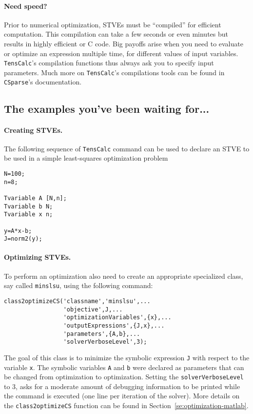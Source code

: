 \documentclass[11pt]{article}
\newcommand{\TC}{\texttt{TensCalc}}
\newcommand{\CS}{\texttt{CSparse}}
\theoremstyle{remark}
\begin{document}
\paragraph{Need speed?}
Prior to numerical optimization, STVEs must be ``compiled'' for
efficient computation. This compilation can take a few seconds or even
minutes but results in highly efficient \matlab{} or C code. Big
payoffs arise when you need to evaluate or optimize an expression
multiple time, for different values of input variables. \TC{}'s
compilation functions thus always ask you to specify input
parameters. Much more on \TC{}'s compilations tools can be found in
\CS{}'s documentation.

\subsection{The examples you've been waiting for...}

\paragraph{Creating STVEs.} The following sequence of \TC{} command can
be used to declare an STVE to be used in a simple least-squares
optimization problem
\begin{lstlisting}
N=100;
n=8;

Tvariable A [N,n];
Tvariable b N;
Tvariable x n;

y=A*x-b;
J=norm2(y);
\end{lstlisting}

\paragraph{Optimizing STVEs.}
To perform an optimization also need to create an appropriate
specialized \matlab{} class, say called \lstinline{minslsu}, using the
following command:
\begin{lstlisting}
class2optimizeCS('classname','minslsu',...
                 'objective',J,...
                 'optimizationVariables',{x},...
                 'outputExpressions',{J,x},...
                 'parameters',{A,b},...
                 'solverVerboseLevel',3);
\end{lstlisting}
The goal of this class is to minimize the symbolic expression
\lstinline{J} with respect to the variable \lstinline{x}. The symbolic
variables \lstinline{A} and \lstinline{b} were declared as parameters
that can be changed from optimization to optimization. Setting the
\lstinline{solverVerboseLevel} to 3, asks for a moderate amount of
debugging information to be printed while the command is executed (one
line per iteration of the solver). More details on the
\lstinline{class2optimizeCS} function can be found in
Section~\ref{se:optimization-matlab}.
\end{document}
